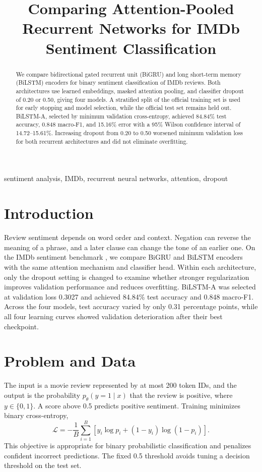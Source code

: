 \documentclass[conference]{IEEEtran}
\title{Comparing Attention-Pooled Recurrent Networks for IMDb Sentiment Classification}
\author{
\IEEEauthorblockN{Nicholas Ampimah, Yin Po Po Aung, and Jane Ohia}
\IEEEauthorblockA{ CSCE 879 - Introduction to Deep Learning}
}
\begin{document}
\maketitle

\begin{abstract}
We compare bidirectional gated recurrent unit (BiGRU) and long short-term memory (BiLSTM) encoders for binary sentiment classification of IMDb reviews. Both architectures use learned embeddings, masked attention pooling, and classifier dropout of 0.20 or 0.50, giving four models. A stratified split of the official training set is used for early stopping and model selection, while the official test set remains held out. BiLSTM-A, selected by minimum validation cross-entropy, achieved 84.84\% test accuracy, 0.848 macro-F1, and 15.16\% error with a 95\% Wilson confidence interval of 14.72--15.61\%. Increasing dropout from 0.20 to 0.50 worsened minimum validation loss for both recurrent architectures and did not eliminate overfitting.
\end{abstract}

\begin{IEEEkeywords}
sentiment analysis, IMDb, recurrent neural networks, attention, dropout
\end{IEEEkeywords}

\section{Introduction}
Review sentiment depends on word order and context. Negation can reverse the meaning of a phrase, and a later clause can change the tone of an earlier one. On the IMDb sentiment benchmark \cite{maas}, we compare BiGRU and BiLSTM encoders with the same attention mechanism and classifier head. Within each architecture, only the dropout setting is changed to examine whether stronger regularization improves validation performance and reduces overfitting. BiLSTM-A was selected at validation loss 0.3027 and achieved 84.84\% test accuracy and 0.848 macro-F1. Across the four models, test accuracy varied by only 0.31 percentage points, while all four learning curves showed validation deterioration after their best checkpoint.

\section{Problem and Data}
The input is a movie review represented by at most 200 token IDs, and the output is the probability $p_\theta(y=1\mid x)$ that the review is positive, where $y\in\{0,1\}$. A score above 0.5 predicts positive sentiment. Training minimizes binary cross-entropy,
\begin{equation}
\mathcal{L}=-\frac{1}{B}\sum_{i=1}^{B}
[y_i\log p_i+(1-y_i)\log(1-p_i)].
\end{equation}
This objective is appropriate for binary probabilistic classification and penalizes confident incorrect predictions. The fixed 0.5 threshold avoids tuning a decision threshold on the test set.
\end{document}

